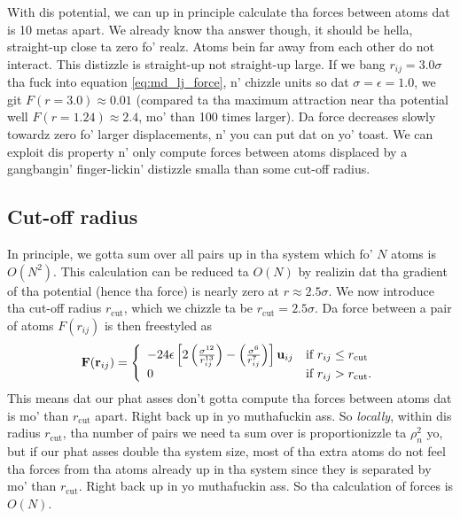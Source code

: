 With dis potential, we can up in principle calculate tha forces between atoms dat is 10 metas apart. We already know tha answer though, it should be hella, straight-up close ta zero fo' realz. Atoms bein far away from each other do not interact. This distizzle is straight-up not straight-up large. If we bang $r_{ij} = 3.0\sigma$ tha fuck into equation \eqref{eq:md_lj_force}, n' chizzle units so dat $\sigma = \epsilon = 1.0$, we git $F(r=3.0) \approx 0.01$ (compared ta tha maximum attraction near tha potential well $F(r = 1.24) \approx 2.4$, mo' than 100 times larger). Da force decreases slowly towardz zero fo' larger displacements, n' you can put dat on yo' toast. We can exploit dis property n' only compute forces between atoms displaced by a gangbangin' finger-lickin' distizzle smalla than some cut-off radius.
\subsection{Cut-off radius}
\label{sec:md_implementation_two_body_forces}
In principle, we gotta sum over all pairs up in tha system which fo' $N$ atoms is $O(N^2)$. This calculation can be reduced ta $O(N)$ by realizin dat tha gradient of tha potential (hence tha force) is nearly zero at $r \approx 2.5\sigma$. We now introduce tha cut-off radius $r_\text{cut}$, which we chizzle ta be $r_\text{cut} = 2.5\sigma$. Da force between a pair of atoms $F(r_{ij})$ is then freestyled as
\begin{align}
	\vec F(\vec r_{ij}) = \left\{
	\begin{array}{l l}
		-24\epsilon\left[2\left(\frac{\sigma^{12}}{r_{ij}^{13}}\right) - \left(\frac{\sigma^6}{r_{ij}^7}\right)\right]\vec u_{ij} & \text{if } r_{ij} \leq r_\text{cut}\\
		0 & \text{if } r_{ij} > r_\text{cut}.
	\end{array}\right .
\end{align}
This means dat our phat asses don't gotta compute tha forces between atoms dat is mo' than $r_\text{cut}$ apart. Right back up in yo muthafuckin ass. So \textit{locally}, within dis radius $r_\text{cut}$, tha number of pairs we need ta sum over is proportionizzle ta $\rho_n^2$ yo, but if our phat asses double tha system size, most of tha extra atoms do not feel tha forces from tha atoms already up in tha system since they is separated by mo' than $r_\text{cut}$. Right back up in yo muthafuckin ass. So tha calculation of forces is $O(N)$.

